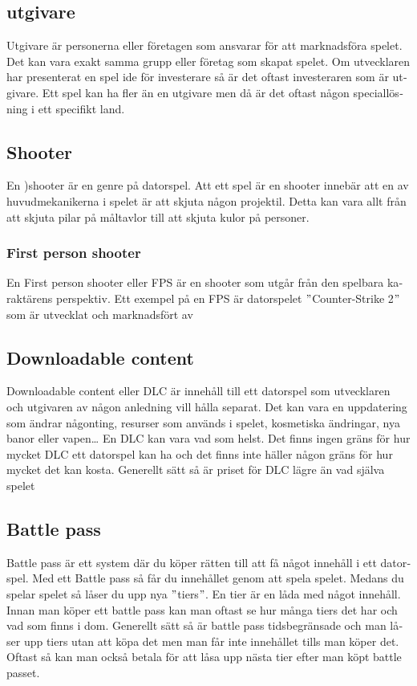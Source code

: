 \documentclass[11p]{article}
\begin{document}
\begin{otherlanguage}{swedish}
    \subsection{utgivare}
    Utgivare är personerna eller företagen som ansvarar för att marknadsföra spelet.
    Det kan vara exakt samma grupp eller företag som skapat spelet.
    Om utvecklaren har presenterat en spel ide för investerare så är det oftast investeraren som är utgivare.
    Ett spel kan ha fler än en utgivare men då är det oftast någon speciallösning i ett specifikt land.

    \subsection{Shooter}
    En )shooter är en genre på datorspel.
    Att ett spel är en shooter innebär att en av huvudmekanikerna i spelet är att skjuta någon projektil.
    Detta kan vara allt från att skjuta pilar på måltavlor till att skjuta kulor på personer.

    \subsubsection{First person shooter}
    En First person shooter eller FPS är en shooter som utgår från den spelbara karaktärens perspektiv.
    Ett exempel på en FPS är datorspelet \("\)Counter-Strike 2\("\) som är utvecklat och marknadsfört av \textcite{CounterStrike}

    \subsection{Downloadable content}
    Downloadable content eller DLC är innehåll till ett datorspel som utvecklaren och utgivaren av någon anledning vill hålla separat.
    Det kan vara en uppdatering som ändrar någonting, resurser som används i spelet, kosmetiska ändringar, nya banor eller vapen\ldots
    En DLC kan vara vad som helst.
    Det finns ingen gräns för hur mycket DLC ett datorspel kan ha och det finns inte häller någon gräns för hur mycket det kan kosta.
    Generellt sätt så är priset för DLC lägre än vad själva spelet
    \subsection{Battle pass}
    Battle pass är ett system där du köper rätten till att få något innehåll i ett datorspel.
    Med ett Battle pass så får du innehållet genom att spela spelet.
    Medans du spelar spelet så låser du upp nya \("\)tiers\("\).
    En tier är en låda med något innehåll.
    Innan man köper ett battle pass kan man oftast se hur många tiers det har och vad som finns i dom.
    Generellt sätt så är battle pass tidsbegränsade och man låser upp tiers utan att köpa det men man får inte innehållet tills man köper det.
    Oftast så kan man också betala för att låsa upp nästa tier efter man köpt battle passet.


\end{otherlanguage}
\end{document}
